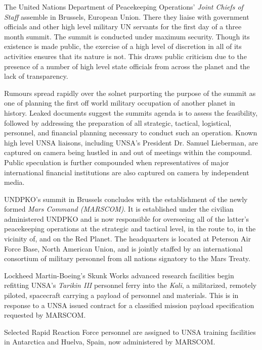 The United Nations Department of Peacekeeping Operations' {\it Joint Chiefs of Staff} assemble in Brussels, European Union. There they liaise with government officials and other high level military UN servants for the first day of a three month summit. The summit is conducted under maximum security. Though its existence is made public, the exercise of a high level of discretion in all of its activities ensures that its nature is not. This draws public criticism due to the presence of a number of high level state officials from across the planet and the lack of transparency.

Rumours spread rapidly over the solnet purporting the purpose of the summit as one of planning the first off world military occupation of another planet in history. Leaked documents suggest the summits agenda is to assess the feasibility, followed by addressing the preparation of all strategic, tactical, logistical, personnel, and financial planning necessary to conduct such an operation. Known high level UNSA liaisons, including UNSA's President Dr. Samuel Lieberman, are captured on camera being hustled in and out of meetings within the compound. Public speculation is further compounded when representatives of major international financial institutions are also captured on camera by independent media.
\StopTimelineDate

UNDPKO's summit in Brussels concludes with the establishment of the newly formed {\it Mars Command (MARSCOM)}. It is established under the civilian administered UNDPKO and is now responsible for overseeing all of the latter's peacekeeping operations at the strategic and tactical level, in the route to, in the vicinity of, and on the Red Planet. The headquarters is located at Peterson Air Force Base, North American Union, and is jointly staffed by an international consortium of military personnel from all nations signatory to the Mars Treaty.
\StopTimelineDate

Lockheed Martin-Boeing's Skunk Works advanced research facilities begin refitting UNSA's {\it Tarikin III} personnel ferry into the {\it Kali}, a militarized, remotely piloted, spacecraft carrying a payload of personnel and materials. This is in response to a UNSA issued contract for a classified mission payload specification requested by MARSCOM.
\StopTimelineDate

Selected Rapid Reaction Force personnel are assigned to UNSA training facilities in Antarctica and Huelva, Spain, now administered by MARSCOM.
\StopTimelineDate

